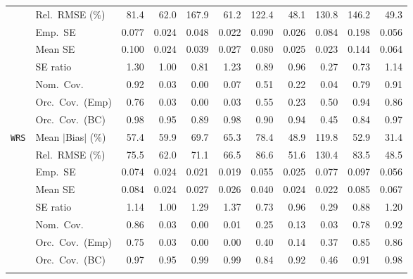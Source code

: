 \begin{landscape}
\begin{longtable}{llrrrrrrrrr}
 & Rel.\ RMSE (\%) & 81.4 & 62.0 & 167.9 & \cellcolor{rankthree}61.2 & 122.4 & \cellcolor{rankone}48.1 & 130.8 & 146.2 & \cellcolor{ranktwo}49.3 \\
 & Emp.\ SE & 0.077 & 0.024 & 0.048 & 0.022 & 0.090 & 0.026 & 0.084 & 0.198 & 0.056 \\
 & Mean SE & 0.100 & 0.024 & 0.039 & 0.027 & 0.080 & 0.025 & 0.023 & 0.144 & 0.064 \\
 & SE ratio & 1.30 & \cellcolor{rankone}1.00 & 0.81 & 1.23 & \cellcolor{rankthree}0.89 & \cellcolor{ranktwo}0.96 & 0.27 & 0.73 & 1.14 \\
 & Nom.\ Cov. & \cellcolor{rankone}0.92 & 0.03 & 0.00 & 0.07 & 0.51 & 0.22 & 0.04 & \cellcolor{rankthree}0.79 & \cellcolor{ranktwo}0.91 \\
 & Orc.\ Cov.\ (Emp) & \cellcolor{rankthree}0.76 & 0.03 & 0.00 & 0.03 & 0.55 & 0.23 & 0.50 & \cellcolor{rankone}0.94 & \cellcolor{ranktwo}0.86 \\
 & Orc.\ Cov.\ (BC) & 0.98 & \cellcolor{rankone}0.95 & 0.89 & 0.98 & 0.90 & \cellcolor{ranktwo}0.94 & 0.45 & 0.84 & \cellcolor{rankthree}0.97 \\
\addlinespace[2pt]
\quad \texttt{WRS} & Mean $|$Bias$|$ (\%) & 57.4 & 59.9 & 69.7 & 65.3 & 78.4 & \cellcolor{ranktwo}48.9 & 119.8 & \cellcolor{rankthree}52.9 & \cellcolor{rankone}31.4 \\
 & Rel.\ RMSE (\%) & 75.5 & \cellcolor{rankthree}62.0 & 71.1 & 66.5 & 86.6 & \cellcolor{ranktwo}51.6 & 130.4 & 83.5 & \cellcolor{rankone}48.5 \\
 & Emp.\ SE & 0.074 & 0.024 & 0.021 & 0.019 & 0.055 & 0.025 & 0.077 & 0.097 & 0.056 \\
 & Mean SE & 0.084 & 0.024 & 0.027 & 0.026 & 0.040 & 0.024 & 0.022 & 0.085 & 0.067 \\
 & SE ratio & 1.14 & \cellcolor{rankone}1.00 & 1.29 & 1.37 & 0.73 & \cellcolor{ranktwo}0.96 & 0.29 & \cellcolor{rankthree}0.88 & 1.20 \\
 & Nom.\ Cov. & \cellcolor{ranktwo}0.86 & 0.03 & 0.00 & 0.01 & 0.25 & 0.13 & 0.03 & \cellcolor{rankthree}0.78 & \cellcolor{rankone}0.92 \\
 & Orc.\ Cov.\ (Emp) & \cellcolor{rankthree}0.75 & 0.03 & 0.00 & 0.00 & 0.40 & 0.14 & 0.37 & \cellcolor{ranktwo}0.85 & \cellcolor{rankone}0.86 \\
 & Orc.\ Cov.\ (BC) & \cellcolor{ranktwo}0.97 & \cellcolor{rankone}0.95 & 0.99 & 0.99 & 0.84 & \cellcolor{rankthree}0.92 & 0.46 & 0.91 & \cellcolor{rankthree}0.98 \\
\addlinespace[2pt]

\end{longtable}
\end{landscape}
